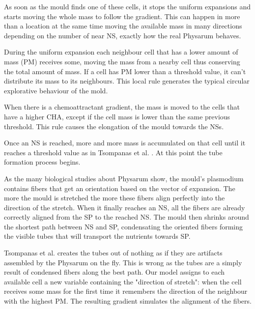\par
As soon as the mould finds one of these cells, it stops the uniform expansions and starts moving the whole mass to follow the gradient. This can happen in more than a location at the same time moving the available mass in many directions depending on the number of near NS, exactly how the real Physarum behaves.

\par
During the uniform expansion each neighbour cell that has a lower amount of mass (PM) receives some, moving the mass from a nearby cell thus conserving the total amount of mass. If a cell has PM lower than a threshold value, it can't distribute its mass to its neighbours. This local rule generates the typical circular explorative behaviour of the mold.

\par 
When there is a chemoattractant gradient, the mass is moved to the cells that have a higher CHA, except if the cell mass is lower than the same previous threshold. This rule causes the elongation of the mould towards the NSs.

\par
Once an NS is reached, more and more mass is accumulated on that cell until it reaches a threshold value as in Tsompanas et al. \cite{Tsompanas2016}. At this point the tube formation process begins.

\par
As the many biological studies about Physarum show, the mould's plasmodium contains fibers that get an orientation based on the vector of expansion. The more the mould is stretched the more these fibers align perfectly into the direction of the stretch. When it finally reaches an NS, all the fibers are already correctly aligned from the SP to the reached NS. The mould then shrinks around the shortest path between NS and SP, condensating the oriented fibers forming the visible tubes that will transport the nutrients towards SP.

\par
Tsompanas et al. \cite{Tsompanas2016} creates the tubes out of nothing as if they are artifacts assembled by the Physarum on the fly. This is wrong as the tubes are a simply result of condensed fibers along the best path. Our model assigns to each available cell a new variable containing the "direction of stretch": when the cell receives some mass for the first time it remembers the direction of the neighbour with the highest PM. The resulting gradient simulates the alignment of the fibers.

